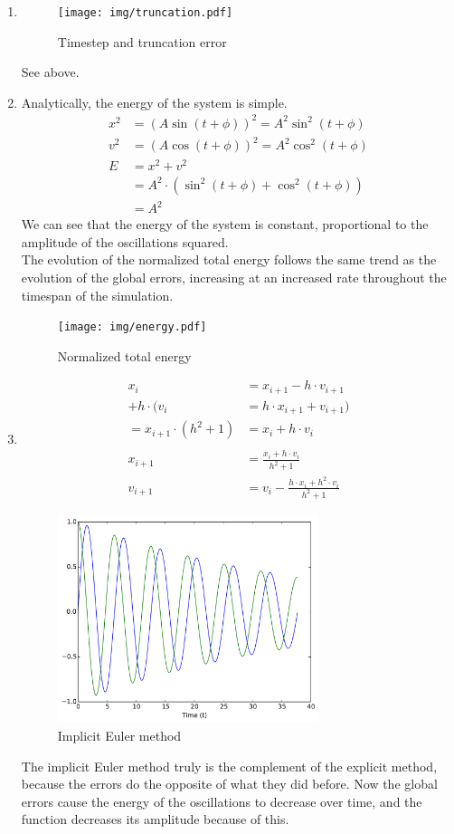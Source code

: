 \documentclass[11pt]{article}
\begin{document}
\begin{enumerate}
\item
\begin{figure}[H]
\centering
\texttt{[image: img/truncation.pdf]}
\caption{Timestep and truncation error}
\end{figure}
See above.

\item
Analytically, the energy of the system is simple. 
\begin{align*}
x^2 &= (A \sin (t + \phi))^2 = A^2 \sin^2 (t + \phi) \\
v^2 &= (A \cos (t + \phi))^2 = A^2 \cos^2 (t + \phi) \\
E &= x^2 + v^2 \\
&= A^2 \cdot \left( \sin^2 (t + \phi) + \cos^2 (t + \phi) \right) \\
&= A^2
\end{align*}
We can see that the energy of the system is constant, proportional to the amplitude of the oscillations squared. \\
The evolution of the normalized total energy follows the same trend as the evolution of the global errors, increasing at an increased rate throughout the timespan of the simulation.
\begin{figure}[H]
\centering
\texttt{[image: img/energy.pdf]}
\caption{Normalized total energy}
\end{figure}

\item
\begin{align*}
x_i &= x_{i+1} - h \cdot v_{i+1} \\
+ h \cdot (v_i &= h \cdot x_{i+1} + v_{i+1}) \\
= x_{i+1} \cdot (h^2 + 1) &= x_i + h \cdot v_i \\ \\
x_{i+1} &= \frac{x_i + h \cdot v_i}{h^2 + 1} \\
v_{i+1} &= v_i - \frac{h \cdot x_i + h^2 \cdot v_i}{h^2 + 1}
\end{align*}
\begin{figure}[h]
\centering
\includegraphics[width=3in]{img/implicit.pdf}
\caption{Implicit Euler method}
\end{figure}
The implicit Euler method truly is the complement of the explicit method, because the errors do the opposite of what they did before. Now the global errors cause the energy of the oscillations to decrease over time, and the function decreases its amplitude because of this. 

\end{enumerate}
\end{document}
